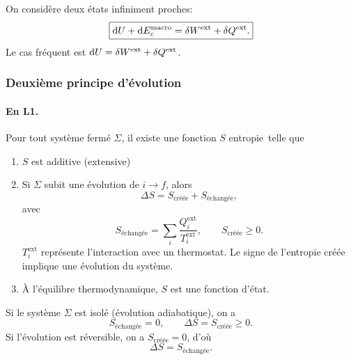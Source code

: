                 On considère deux états infiniment proches:
                \begin{equation*}
                    \boxed{
                        \mathrm{d} U+\mathrm{d} E_c^{\text{macro}}=\delta W^{\text{ext}}+\delta Q^{\text{ext}}.
                    }
                \end{equation*}
                Le cas fréquent est $\mathrm{d} U=\delta W^{\text{ext}}+\delta Q^{\text{ext}}$.

        \subsubsection{Deuxième principe \og d'évolution\fg}

            \paragraph{En L1.}
                Pour tout système fermé $\Sigma$, il existe une fonction $S$ \og entropie\fg~telle que
                \begin{enumerate}
                    \item $S$ est additive (extensive)
                    \item Si $\Sigma$ subit une évolution de $i\to f$, alors
                    \begin{equation*}
                        \boxed{
                            \Delta S=S_{\text{créée}}+S_{\text{échangée}},
                        }
                    \end{equation*}
                    avec
                    \begin{equation*}
                        S_{\text{échangée}}=\sum_{i}\frac{Q_i^{\text{ext}}}{T_i^{\text{ext}}},\qquad S_{\text{créée}}\geqslant 0.
                    \end{equation*}
                    $T_i^{\text{ext}}$ représente l'interaction avec un thermostat. Le signe de l'entropie créée implique une évolution du système.
                    \item À l'équilibre thermodynamique, $S$ est une fonction d'état.
                \end{enumerate}

                Si le système $\Sigma$ est isolé (évolution adiabatique), on a 
                \begin{equation*}
                    \boxed{
                        S_{\text{échangée}}=0,\qquad\Delta S=S_{\text{créée}}\geqslant0.
                    }
                \end{equation*}
                Si l'évolution est réversible, on a $S_{\text{créée}}=0$, d'où 
                \begin{equation*}
                    \boxed{
                        \Delta S=S_{\text{échangée}}.
                    }
                \end{equation*}


